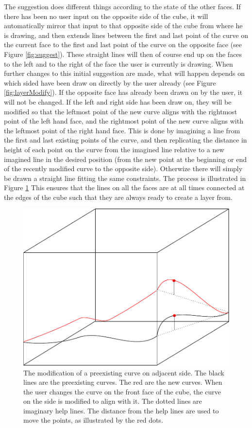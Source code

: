 \documentclass[a4paper,12pt]{report}
\begin{document}
The suggestion does different things according to the state of the other faces. If there has been no user input on the opposite side of the cube, it will automatically mirror that input to that opposite side of the cube from where he is drawing, and then extends lines between the first and last point of the curve on the current face to the first and last point of the curve on the opposite face (see Figure \ref{fig:suggest}). These straight lines will then of course end up on the faces to the left and to the right of the face the user is currently is drawing. When further changes to this initial suggestion are made, what will happen depends on which sided have been draw on directly by the user already (see Figure \ref{fig:layerModify}). If the opposite face has already been drawn on by the user, it will not be changed. If the left and right side has been draw on, they will be modified so that the leftmost point of the new curve aligns with the rightmost point of the left hand face, and the rightmost point of 
the new curve aligns with the leftmost point of the right hand face.
 This is done by imagining a line from the first and last existing points of the curve, and then replicating the distance in height of each point on the curve from the imagined line relative to a new imagined line in the desired position (from the new point at the beginning or end of the recently modified curve to the opposite side). Otherwize there will simply be drawn a straight line fitting the same 
constraints. The process is illustrated in Figure \ref{fig:changeSide} This ensures that the lines on all the faces are at all times connected at the edges of the cube such that they are always ready to create a layer from.

\begin{figure}
\centering
\includegraphics[width=.8\linewidth]{thesis/changeSide.pdf}
 \caption{The modification of a preexisting curve on adjacent side. The black lines are the preexisting curves. The red are the new curves. When the user changes the curve on the front face of the cube, the curve on the side is modified to align with it. The dotted lines are imaginary help lines. The distance from the help lines are used to move the points, as illustrated by the red dots.}
 \label{fig:changeSide}
\end{figure}
\end{document}
